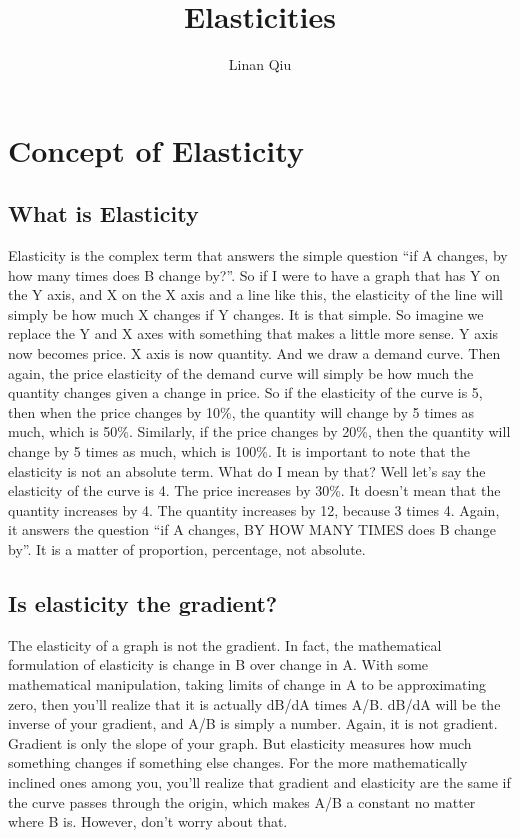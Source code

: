 \documentclass[DIV=classic,11pt,numbers=noenddot,listof=totoc,bibliography=totoc,parskip]{scrartcl}
\title{Elasticities}
\author{Linan Qiu}
\date{}
\begin{document}
\maketitle
\tableofcontents
\newpage
\section{Concept of Elasticity}
\subsection{What is Elasticity}
Elasticity is the complex term that answers the simple question “if A changes, by how many times does B change by?”. So if I were to have a graph that has Y on the Y axis, and X on the X axis and a line like this, the elasticity of the line will simply be how much X changes if Y changes. It is that simple. So imagine we replace the Y and X axes with something that makes a little more sense. Y axis now becomes price. X axis is now quantity. And we draw a demand curve. Then again, the price elasticity of the demand curve will simply be how much the quantity changes given a change in price. So if the elasticity of the curve is 5, then when the price changes by 10\%, the quantity will change by 5 times as much, which is 50\%. Similarly, if the price changes by 20\%, then the quantity will change by 5 times as much, which is 100\%. It is important to note that the elasticity is not an absolute term. What do I mean by that? Well let’s say the elasticity of the curve is 4. The price increases by 30\%. It doesn’t mean that the quantity increases by 4. The quantity increases by 12, because 3 times 4. Again, it answers the question “if A changes, BY HOW MANY TIMES does B change by”. It is a matter of proportion, percentage, not absolute. 
\subsection{Is elasticity the gradient?}
The elasticity of a graph is not the gradient. In fact, the mathematical formulation of elasticity is change in B over change in A. With some mathematical manipulation, taking limits of change in A to be approximating zero, then you’ll realize that it is actually dB/dA times A/B. dB/dA will be the inverse of your gradient, and A/B is simply a number. Again, it is not gradient. Gradient is only the slope of your graph. But elasticity measures how much something changes if something else changes. For the more mathematically inclined ones among you, you’ll realize that gradient and elasticity are the same if the curve passes through the origin, which makes A/B a constant no matter where B is. However, don’t worry about that.
\end{document}
